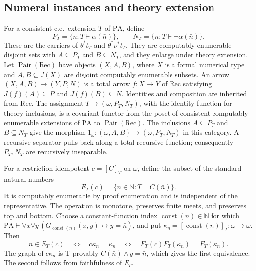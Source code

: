 \documentclass[11pt]{article}
\newcommand{\N}{\mathbb N}
\newcommand{\PA}{\mathrm{PA}}
\begin{document}
\subsection{Numeral instances and theory extension}

For a consistent c.e.\ extension $T$ of $\PA$, define
\[
 P_T=\{n:T\vdash\alpha(\bar n)\},\qquad
 N_T=\{n:T\vdash\neg\alpha(\bar n)\}.
\]
These are the carriers of $\theta^*t_T$ and $\theta^*\nu^*t_T$.
They are computably enumerable disjoint sets with $A\subseteq P_T$
and $B\subseteq N_T$, and they enlarge under theory extension.
Let $\operatorname{Pair}(\mathrm{Rec})$ have objects $(X,A,B)$,
where $X$ is a formal numerical type and $A,B\subseteq J(X)$
are disjoint computably enumerable subsets.
An arrow $(X,A,B)\to(Y,P,N)$ is a total arrow $f:X\to Y$
of $\mathrm{Rec}$ satisfying $J(f)(A)\subseteq P$ and
$J(f)(B)\subseteq N$. Identities and composition are inherited
from $\mathrm{Rec}$. The assignment
$T\mapsto(\omega,P_T,N_T)$, with the identity function for theory
inclusions, is a covariant functor from the poset of consistent
computably enumerable extensions of $\PA$ to
$\operatorname{Pair}(\mathrm{Rec})$.
The inclusions $A\subseteq P_T$ and $B\subseteq N_T$ give the morphism
$1_\omega:(\omega,A,B)\to(\omega,P_T,N_T)$ in this category.
A recursive separator pulls back along a total recursive function;
consequently $P_T,N_T$ are recursively inseparable.


For a restriction idempotent
$c=[C]_T$ on $\omega$, define the subset of the standard natural numbers
\begin{equation}\label{eq:observation}
 E_T(c)=\{n\in\N:T\vdash C(\bar n)\}.
\end{equation}
It is computably enumerable by proof enumeration and is independent of
the representative. The operation is monotone, preserves finite meets,
and preserves top and bottom. Choose a constant-function index
$\operatorname{const}(n)\in\N$ for which
$\PA\vdash\forall x\forall y\,
(G_{\operatorname{const}(n)}(x,y)\leftrightarrow y=\bar n)$, and put
$\kappa_n=[\operatorname{const}(n)]_T:\omega\to\omega$. Then
\begin{equation}\label{eq:faithful-observation}
 n\in E_T(c)
 \quad\Longleftrightarrow\quad c\kappa_n=\kappa_n
 \quad\Longleftrightarrow\quad
 F_T(c)F_T(\kappa_n)=F_T(\kappa_n).
\end{equation}
The graph of $c\kappa_n$ is T-provably
$C(\bar n)\land y=\bar n$, which gives the first equivalence.
The second follows from faithfulness of $F_T$.
\end{document}
